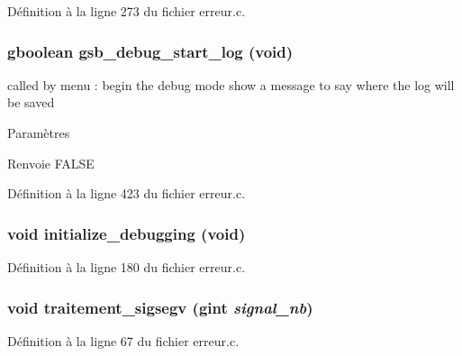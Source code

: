 Définition à la ligne 273 du fichier erreur.c.

\subsubsection[{gsb\_\-debug\_\-start\_\-log}]{\setlength{\rightskip}{0pt plus 5cm}gboolean gsb\_\-debug\_\-start\_\-log (void)}\label{erreur_8h_a8321053275e249fd34c4890aec24ab1e}
called by menu : begin the debug mode show a message to say where the log will be saved


\begin{DoxyParams}{Paramètres}
\item[{\em }]\end{DoxyParams}
\begin{DoxyReturn}{Renvoie}
FALSE 
\end{DoxyReturn}


Définition à la ligne 423 du fichier erreur.c.

\subsubsection[{initialize\_\-debugging}]{\setlength{\rightskip}{0pt plus 5cm}void initialize\_\-debugging (void)}\label{erreur_8h_ab6d5eff68f3c78505c67b358955c3e85}


Définition à la ligne 180 du fichier erreur.c.

\subsubsection[{traitement\_\-sigsegv}]{\setlength{\rightskip}{0pt plus 5cm}void traitement\_\-sigsegv (gint {\em signal\_\-nb})}\label{erreur_8h_aac06461c37298dba178aed1b0c3fde98}


Définition à la ligne 67 du fichier erreur.c.

